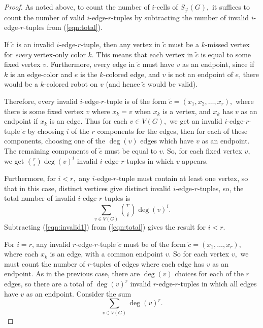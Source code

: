 \documentclass[10pt,a4paper]{amsart}
\newcommand{\Sr}{S_{\vec{r}}}
\begin{document}
\begin{proof}
As noted above, to count the number of $i$-cells of $\Sr(G),$ it suffices to count the number of valid $i$-edge-$r$-tuples by subtracting the number of invalid $i$-edge-$r$-tuples from (\ref{eqn:total}).

If $\tilde c$ is an invalid $i$-edge-$r$-tuple, then any vertex in $\tilde c$ must be a $k$-missed vertex for \textit{every} vertex-only color $k$. This means that each vertex in $\tilde c$ is equal to some fixed vertex $v.$ Furthermore, every edge in $\tilde c$ must have $v$ as an endpoint, since if $k$ is an edge-color and $e$ is the $k$-colored edge, and $v$ is not an endpoint of $e$, there would be  a $k$-colored robot on $v$ (and hence $\tilde c$ would be valid).


Therefore, every invalid $i$-edge-$r$-tuple is of the form $\tilde c=(x_1,x_2,\dots,x_r),$ where there is some fixed vertex $v$ where $x_k=v$ when $x_k$ is a vertex, and $x_k$ has $v$ as an endpoint if $x_k$ is an edge. Thus for each $v\in V(G),$ we get an invalid $i$-edge-$r$-tuple $\tilde c$ by choosing $i$ of the $r$ components for the edges, then for each of these components, choosing one of the $\deg(v)$ edges which have $v$ as an endpoint. The remaining components of $\tilde c$ must be equal to $v.$ So, for each fixed vertex $v,$ we get $\binom{r}{i}\deg(v)^i$ invalid $i$-edge-$r$-tuples in which $v$ appears.

Furthermore, for $i<r,$ any $i$-edge-$r$-tuple must contain at least one vertex, so that in this case, distinct vertices give distinct invalid $i$-edge-$r$-tuples, so, the total number of invalid $i$-edge-$r$-tuples is 
\begin{equation}\label{eqn:invalid1}
    \sum_{v\in V(G)}\binom{r}{i}\deg(v)^i.
\end{equation}
Subtracting (\ref{eqn:invalid1}) from (\ref{eqn:total}) gives the result for $i<r.$

For $i=r$, any invalid $r$-edge-$r$-tuple $\tilde c$ must be of the form $\tilde{c}=(x_1,\dots,x_r),$ where each $x_k$ is an edge, with a common endpoint $v.$ So for each vertex $v,$ we must count the number of $r$-tuples of edges where each edge has $v$ as an endpoint. As in the previous case, there are $\deg(v)$ choices for each of the $r$ edges, so there are a total of $\deg(v)^r$ invalid $r$-edge-$r$-tuples in which all edges have $v$ as an endpoint. Consider the sum 
\begin{equation}\label{eqn:double}
    \sum_{v\in V(G)}\deg(v)^r.
\end{equation}


\end{proof}
\end{document}
